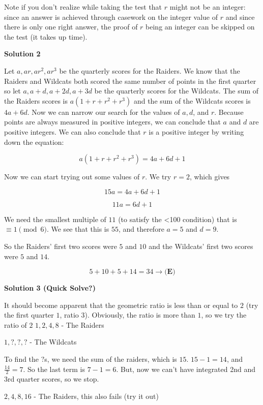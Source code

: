 \begin{enumerate}
 Note if you don't realize while taking the test that $r$ might not be an integer: since an answer is achieved through casework on the integer value of $r$ and since there is only one right answer, the proof of $r$ being an integer can be skipped on the test (it takes up time).

 



\textbf{Solution 2}

Let $a,ar,ar^{2},ar^{3}$ be the quarterly scores for the Raiders. We know that the Raiders and Wildcats both scored the same number of points in the first quarter so let $a,a+d,a+2d,a+3d$ be the quarterly scores for the Wildcats. The sum of the Raiders scores is $a(1+r+r^{2}+r^{3})$ and the sum of the Wildcats scores is $4a+6d$. Now we can narrow our search for the values of $a,d$, and $r$. Because points are always measured in positive integers, we can conclude that $a$ and $d$ are positive integers. We can also conclude that $r$ is a positive integer by writing down the equation:

 
 \[a(1+r+r^{2}+r^{3})=4a+6d+1\]

 Now we can start trying out some values of $r$. We try $r=2$, which gives

 
 \[15a=4a+6d+1\]

 \[11a=6d+1\]

 We need the smallest multiple of $11$ (to satisfy the <100 condition) that is $\equiv 1 \pmod{6}$. We see that this is $55$, and therefore $a=5$ and $d=9$.

 So the Raiders' first two scores were $5$ and $10$ and the Wildcats' first two scores were $5$ and $14$. 

 
 \[5+10+5+14=34 \longrightarrow \boxed{\textbf{(E)}}\]




\textbf{Solution 3 (Quick Solve?)}

It should become apparent that the geometric ratio is less than or equal to $2$ (try the first quarter $1$, ratio $3$). Obviously, the ratio is more than $1$, so we try the ratio of $2$
$1, 2, 4, 8$ - The Raiders 

 $1, ?, ?, ?$ - The Wildcats

 To find the $?$s, we need the sum of the raiders, which is $15$. $15-1=14$, and $\frac{14}2=7$. So the last term is $7-1=6$. But, now we can't have integrated 2nd and 3rd quarter scores, so we stop.

 $2, 4, 8, 16$ - The Raiders, this also fails (try it out)


\end{enumerate}
